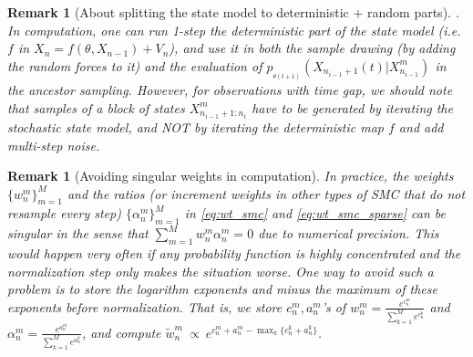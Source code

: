 \documentclass[12pt]{article}
\newtheorem{remark}[theorem]{Remark}
\begin{document}
\begin{remark} [About splitting the state model to deterministic + random parts]. In computation, one can run 1-step the deterministic part of the state model (i.e. $f$ in $X_{n} =f(\theta,X_{n-1})+V_{n}$), and use it in both the sample drawing (by adding the random forces to it) and the evaluation of $p_{_{\theta(t+1)}}(X_{n_{i-1}+1}(t) |X_{n_{i-1}}^m )$ in the ancestor sampling. However, for observations with time gap, we should note that samples of a block of states $X^m_{n_{i-1}+1:n_{i}}$ have to be generated by iterating the stochastic state model, and NOT by iterating the deterministic map $f$ and add multi-step noise. 
\end{remark}

\begin{remark}[Avoiding singular weights in computation] In practice, the weights $\{w_n^m\}_{m=1}^M$ and the ratios (or increment weights in other types of SMC that do not resample every step) $\{\alpha_n^m\}_{m=1}^M$ in \eqref{eq:wt_smc} and  \eqref{eq:wt_smc_sparse} can be singular in the sense that $\sum_{m=1}^M w_n^m\alpha_n^m =0$ due to numerical precision. This would happen very often if any probability function is highly concentrated and the normalization step only makes the situation worse. One way to avoid such a problem is to store the logarithm exponents and minus the maximum of these exponents before normalization. That is, we store $c_n^m, a_n^m$'s of $w_n^m = \frac{e^{c_n^m}}{\sum_{k=1}^M e^{c_n^k}}$ and $\alpha_n^m = \frac{e^{a_n^m}}{\sum_{k=1}^M e^{a_n^k}}$, and compute $\widetilde{w}_n^m \ \propto\  e^{c_n^m + a_n^m  - \max_k\{c_n^k + a_n^k\} }$. 
\end{remark}
\end{document}
